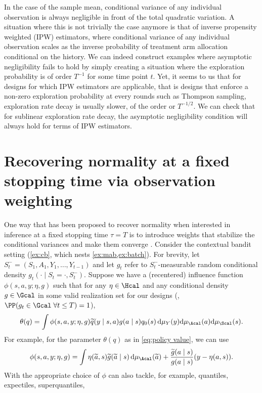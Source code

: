 In the case of the sample mean, conditional variance of any individual observation is always negligible in front of the total quadratic variation. A situation where this is not trivially the case anymore is that of inverse propensity weighted (IPW) estimators, where conditional variance of any individual observation scales as the inverse probability of treatment arm allocation conditional on the history. We can indeed construct examples where asymptotic negligibility fails to hold by simply creating a situation where the exploration probability is of order $T^{-1}$ for some time point $t$. Yet, it seems to us that for designs for which IPW estimators are applicable, that is designs that enforce a non-zero exploration probability at every rounds such as Thompson sampling, exploration rate decay is usually slower, of the order or $T^{-1/2}$. We can check that for sublinear exploration rate decay, the asymptotic negligibility condition will always hold for terms of IPW estimators.

\section{Recovering normality at a fixed stopping time via observation weighting}\label{sec: reweighting}

One way that has been proposed to recover normality when interested in inference at a fixed stopping time $\tau=T$ is to introduce weights that stabilize the conditional variances and make them converge \citep{bibaut2021post,hadad2021confidence,zhan2021off}. Consider the contextual bandit setting (\cref{ex:cb}, which nests \cref{ex:mab,ex:batch}). 
For brevity, let $S_t^-=(S_1,A_1,Y_1,\dots,Y_{t-1})$ and let $g_t$ refer to $S_t^-$-measurable random conditional density $g_t(\cdot\mid S_t=\cdot,S_t^-)$.
Suppose we have a (recentered) influence function $\phi(s,a,y;\eta,g)$ such that for any $\eta\in\Hcal$ and any conditional density $g\in\Gcal$ in some valid realization set for our designs (\ie, $\PP(g_t\in\Gcal\;\forall t\leq T)=1$),
$$
\theta(q) = \int \phi(s,a,y;\eta,g) \widetilde q(y\mid s,a)g(a\mid s)q_0(s)\,\mathrm{d}\mu_Y(y)\mathrm{d}\mu_\Acal(a)\mathrm{d}\mu_\Scal(s).
$$
For example, for 
the parameter $\theta(q)$ as in \cref{eq:policy value}, we can use
\begin{align}\label{eq:cb dr if}
\phi(s,a,y;\eta,g)=\int\eta(\widetilde a,s)\widetilde g(\widetilde a\mid s)\,\mathrm{d}\mu_\Acal(\widetilde a)+\frac{\widetilde g(a\mid s)}{g(a\mid s)}(y-\eta(a,s)).
\end{align}
With the appropriate choice of $\phi$ can also tackle, for example, quantiles, expectiles, superquantiles, \etc

